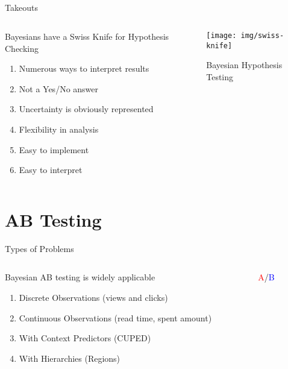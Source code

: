 \documentclass{beamer}
\begin{document}
\subsection{}
\begin{frame}{Takeouts}
\begin{columns}
    \begin{column}{0.5\linewidth}
    Bayesians have a Swiss Knife for Hypothesis Checking
    \begin{enumerate}
        \item Numerous ways to interpret results
        \item Not a Yes/No answer
        \item Uncertainty is obviously represented
        \item Flexibility in analysis
        \item Easy to implement
        \item Easy to interpret
    \end{enumerate}
    \end{column}
    \begin{column}{0.5\linewidth}
    \begin{figure}
        \centering
        \texttt{[image: img/swiss-knife]}
        \caption{Bayesian Hypothesis Testing}
    \end{figure}
    \end{column}
\end{columns}
\section{AB Testing}
\end{frame}
\begin{frame}{Types of Problems}
\begin{columns}
    \begin{column}{0.5\linewidth}
    Bayesian AB testing is widely applicable
    \begin{enumerate}
        \item<alert@2> Discrete Observations (views and clicks)
        \item<alert@2> Continuous Observations (read time, spent amount)
        \item<alert@3> With Context Predictors (CUPED\cite{cuped})
        \item<alert@3> With Hierarchies (Regions)
    \end{enumerate}
    \end{column}
    \begin{column}{0.5\linewidth}
    \centering \Huge \textcolor{red}{A}/\textcolor{blue}{B}
    \end{column}
\end{columns}
\end{frame}
\end{document}
